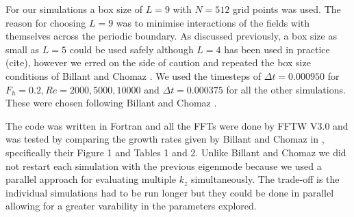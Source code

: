
For our simulations a box size of $L=9$ with $N=512$ grid points was used. The reason for choosing $L=9$ was to minimise interactions of the fields with themselves across the periodic boundary. As discussed previously, a box size as small as $L=5$ could be used safely although $L=4$ has been used in practice (cite), however we erred on the side of caution and repeated the box size conditions of Billant and Chomaz \cite{bc2000c}.  We used the timesteps of $\Delta t=0.000950$ for $F_{h}=0.2,Re=2000,5000,10000$ and $\Delta t=0.000375$ for all the other simulations. These were chosen following Billant and Chomaz \cite{bc2000c}. 


The code was written in Fortran and all the FFTs were done by FFTW V3.0\cite{fftw} and was tested by comparing the growth rates given by Billant and Chomaz in \cite{bc2000c}, specifically their Figure  1 and Tables 1 and 2. Unlike Billant and Chomaz \cite{bc2000c} we did not restart each simulation with the previous eigenmode because we used a parallel approach for evaluating multiple $k_{z}$ simultaneously. The trade-off is the individual simulations had to be run longer but they could be done in parallel allowing for a greater varability in the parameters explored. 



